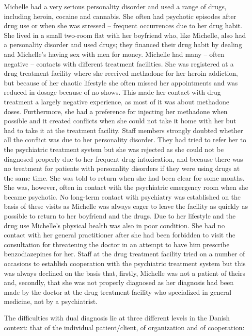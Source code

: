 \begin{multicols}{2}
Michelle had a very serious personality disorder and used a range of drugs, including heroin, cocaine and cannabis. She often had psychotic episodes after drug use or when she was stressed – frequent occurrences due to her drug habit. She lived in a small two-room flat with her boyfriend who, like Michelle, also had a personality disorder and used drugs; they financed their drug habit by dealing and Michelle’s having sex with men for money. Michelle had many – often negative – contacts with different treatment facilities. She was registered at a drug treatment facility where she received methadone for her heroin addiction, but because of her chaotic lifestyle she often missed her appointments and was reduced in dosage because of no-shows. This made her contact with drug treatment a largely negative experience, as most of it was about methadone doses. Furthermore, she had a preference for injecting her methadone when possible and it created conflicts when she could not take it home with her but had to take it at the treatment facility. Staff members strongly doubted whether all the conflict was due to her personality disorder. They had tried to refer her to the psychiatric treatment system but she was rejected as she could not be diagnosed properly due to her frequent drug intoxication, and because there was no treatment for patients with personality disorders if they were using drugs at the same time. She was told to return when she had been clear for some months. She was, however, often in contact with the psychiatric emergency room when she became psychotic. No long-term contact with psychiatry was established on the basis of these visits as Michelle was always eager to leave the facility as quickly as possible to return to her boyfriend and the drugs. Due to her lifestyle and the drug use Michelle’s physical health was also in poor condition. She had no contact with her general practitioner after she had been forbidden to visit the consultation for threatening the doctor in an attempt to have him prescribe benzodiazepines for her. Staff at the drug treatment facility tried on a number of occasions to establish cooperation with the psychiatric treatment system but this was always declined on the basis that, firstly, Michelle was not a patient of theirs and, secondly, that she was not properly diagnosed as her diagnosis had been made by the doctor at the drug treatment facility who specialized in general medicine, not by a psychiatrist.
\par
The difficulties with dual diagnosis lie at three different levels in the Danish context: that of the individual patient/client, of organization and of cooperation:

\end{multicols}
